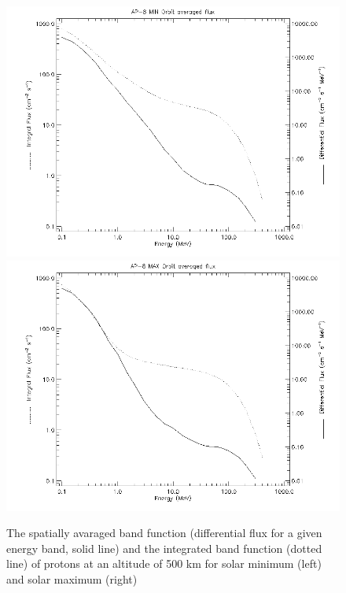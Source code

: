 \documentclass[12pt, a4paper,titlepage]{article}
\numberwithin{equation}{section}
\numberwithin{figure}{section}
\begin{document}
\begin{figure}[htbp]
 \centering %
 \includegraphics[width=.45\textwidth,origin=c,angle=0]{images/alt_500km_AP-8_MIN_averaged_spectra.png}
 \qquad
 \includegraphics[width=.45\textwidth,origin=c]{images/alt_500km_AP-8_MAX_averaged_spectra.png} 
 \caption{\label{fig:band500p} The spatially avaraged band function (differential flux for a given energy band, solid line) and the integrated band function (dotted line) of protons at an altitude of 500 km for solar minimum (left) and solar maximum (right) }
 \end{figure}
\end{document}
